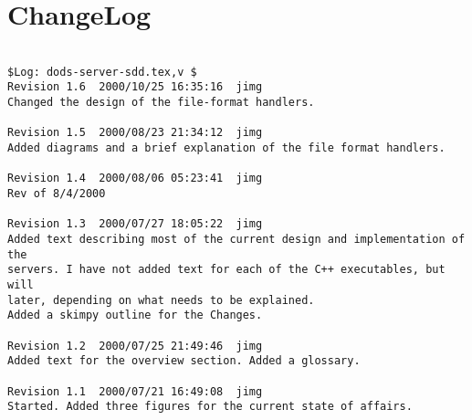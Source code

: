 \documentclass{article}
\begin{document}
\clearpage
\appendix

\section{ChangeLog}
\begin{verbatim}

$Log: dods-server-sdd.tex,v $
Revision 1.6  2000/10/25 16:35:16  jimg
Changed the design of the file-format handlers.

Revision 1.5  2000/08/23 21:34:12  jimg
Added diagrams and a brief explanation of the file format handlers.

Revision 1.4  2000/08/06 05:23:41  jimg
Rev of 8/4/2000

Revision 1.3  2000/07/27 18:05:22  jimg
Added text describing most of the current design and implementation of the
servers. I have not added text for each of the C++ executables, but will
later, depending on what needs to be explained.
Added a skimpy outline for the Changes.

Revision 1.2  2000/07/25 21:49:46  jimg
Added text for the overview section. Added a glossary.

Revision 1.1  2000/07/21 16:49:08  jimg
Started. Added three figures for the current state of affairs.

\end{verbatim}


\raggedright


\end{document}
